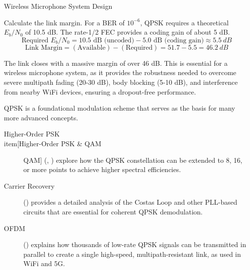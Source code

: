 \begin{workedexample}{Wireless Microphone System Design}
\begin{derivationsteps}
        \step Calculate the link margin. For a BER of $10^{-6}$, QPSK requires a theoretical $E_b/N_0$ of 10.5 dB. The rate-1/2 FEC provides a coding gain of about 5 dB.
        \[ \text{Required } E_b/N_0 = 10.5 \text{ dB (uncoded)} - 5.0 \text{ dB (coding gain)} \approx \qty{5.5}{dB} \]
        \[ \text{Link Margin} = (\text{Available}) - (\text{Required}) = 51.7 - 5.5 = \qty{46.2}{dB} \]
    \end{derivationsteps}
    
     The link closes with a massive margin of over 46 dB. This is essential for a wireless microphone system, as it provides the robustness needed to overcome severe multipath fading (20-30 dB), body blocking (5-10 dB), and interference from nearby WiFi devices, ensuring a dropout-free performance.
\end{workedexample}


\begin{importantbox}[title={Further Reading}]
    QPSK is a foundational modulation scheme that serves as the basis for many more advanced concepts.
    \begin{description}
        \item[Higher-Order PSK \\item[Higher-Order PSK & QAM] QAM] (, ) explore how the QPSK constellation can be extended to 8, 16, or more points to achieve higher spectral efficiencies.
        \item[Carrier Recovery] () provides a detailed analysis of the Costas Loop and other PLL-based circuits that are essential for coherent QPSK demodulation.
        \item[OFDM] () explains how thousands of low-rate QPSK signals can be transmitted in parallel to create a single high-speed, multipath-resistant link, as used in WiFi and 5G.
    \end{description}
\end{importantbox}
